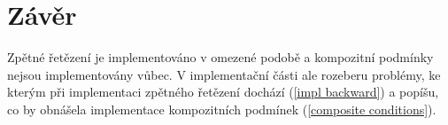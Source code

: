 \section{Závěr}
Zpětné řetězení je
implementováno v omezené podobě a kompozitní podmínky nejsou implementovány
vůbec. V implementační části ale rozeberu problémy, ke kterým při implementaci
zpětného řetězení dochází (\ref{impl backward}) a popíšu, co by obnášela
implementace kompozitních podmínek (\ref{composite conditions}).
